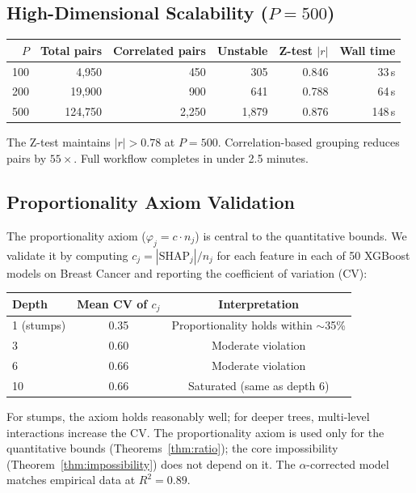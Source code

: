 \documentclass{jmlr}
\begin{document}
\subsection{High-Dimensional Scalability ($P = 500$)}

\begin{center}
\small
\begin{tabular}{@{}rrrrrr@{}}
\toprule
$P$ & Total pairs & Correlated pairs & Unstable & Z-test $|r|$ & Wall time \\
\midrule
100 & 4,950 & 450 & 305 & 0.846 & 33\,s \\
200 & 19,900 & 900 & 641 & 0.788 & 64\,s \\
500 & 124,750 & 2,250 & 1,879 & 0.876 & 148\,s \\
\bottomrule
\end{tabular}
\end{center}

The Z-test maintains $|r| > 0.78$ at $P = 500$. Correlation-based grouping reduces pairs by $55\times$. Full workflow completes in under 2.5 minutes.

\subsection{Proportionality Axiom Validation}

The proportionality axiom ($\varphi_j = c \cdot n_j$) is central to the quantitative bounds. We validate it by computing $c_j = |\text{SHAP}_j| / n_j$ for each feature in each of 50 XGBoost models on Breast Cancer and reporting the coefficient of variation (CV):

\begin{center}
\small
\begin{tabular}{@{}lcc@{}}
\toprule
Depth & Mean CV of $c_j$ & Interpretation \\
\midrule
1 (stumps) & 0.35 & Proportionality holds within $\sim$35\% \\
3 & 0.60 & Moderate violation \\
6 & 0.66 & Moderate violation \\
10 & 0.66 & Saturated (same as depth 6) \\
\bottomrule
\end{tabular}
\end{center}

For stumps, the axiom holds reasonably well; for deeper trees, multi-level interactions increase the CV. The proportionality axiom is used only for the quantitative bounds (Theorems~\ref{thm:ratio}); the core impossibility (Theorem~\ref{thm:impossibility}) does not depend on it. The $\alpha$-corrected model matches empirical data at $R^2 = 0.89$.
\end{document}
